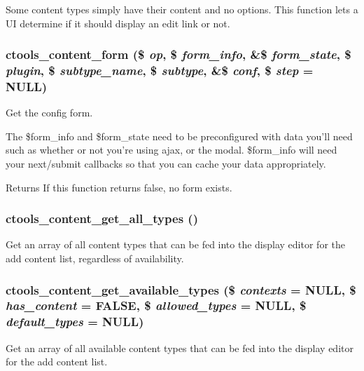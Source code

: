 Some content types simply have their content and no options. This function lets a UI determine if it should display an edit link or not. \hypertarget{content_8inc_a1eac5a29677be088ca112ac5158059a8}{
\subsubsection[{ctools\_\-content\_\-form}]{\setlength{\rightskip}{0pt plus 5cm}ctools\_\-content\_\-form (\$ {\em op}, \/  \$ {\em form\_\-info}, \/  \&\$ {\em form\_\-state}, \/  \$ {\em plugin}, \/  \$ {\em subtype\_\-name}, \/  \$ {\em subtype}, \/  \&\$ {\em conf}, \/  \$ {\em step} = {\ttfamily NULL})}}
\label{content_8inc_a1eac5a29677be088ca112ac5158059a8}
Get the config form.

The \$form\_\-info and \$form\_\-state need to be preconfigured with data you'll need such as whether or not you're using ajax, or the modal. \$form\_\-info will need your next/submit callbacks so that you can cache your data appropriately.

\begin{DoxyReturn}{Returns}
If this function returns false, no form exists. 
\end{DoxyReturn}
\hypertarget{content_8inc_aec142fe1e425f0d7087368dc17d4fd48}{
\subsubsection[{ctools\_\-content\_\-get\_\-all\_\-types}]{\setlength{\rightskip}{0pt plus 5cm}ctools\_\-content\_\-get\_\-all\_\-types ()}}
\label{content_8inc_aec142fe1e425f0d7087368dc17d4fd48}
Get an array of all content types that can be fed into the display editor for the add content list, regardless of availability. \hypertarget{content_8inc_a39110a11fabc723e97f07881a8f7a16f}{
\subsubsection[{ctools\_\-content\_\-get\_\-available\_\-types}]{\setlength{\rightskip}{0pt plus 5cm}ctools\_\-content\_\-get\_\-available\_\-types (\$ {\em contexts} = {\ttfamily NULL}, \/  \$ {\em has\_\-content} = {\ttfamily FALSE}, \/  \$ {\em allowed\_\-types} = {\ttfamily NULL}, \/  \$ {\em default\_\-types} = {\ttfamily NULL})}}
\label{content_8inc_a39110a11fabc723e97f07881a8f7a16f}
Get an array of all available content types that can be fed into the display editor for the add content list.


